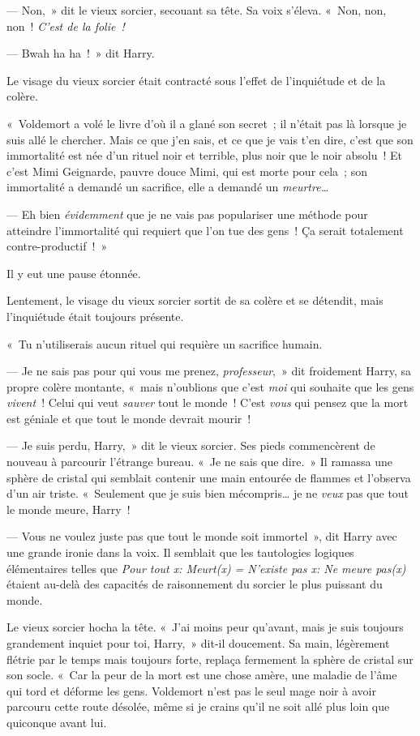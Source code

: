 --- Non,~» dit le vieux sorcier, secouant sa tête. Sa voix s'éleva. «~Non, non, non~! \emph{C'est de la folie~!}

--- Bwah ha ha~!~» dit Harry.

Le visage du vieux sorcier était contracté sous l'effet de l'inquiétude et de la colère.

«~Voldemort a volé le livre d'où il a glané son secret~; il n'était pas là lorsque je suis allé le chercher. Mais ce que j'en sais, et ce que je vais t'en dire, c'est que son immortalité est née d'un rituel noir et terrible, plus noir que le noir absolu~! Et c'est Mimi Geignarde, pauvre douce Mimi, qui est morte pour cela~; son immortalité a demandé un sacrifice, elle a demandé un \emph{meurtre…}

--- Eh bien \emph{évidemment} que je ne vais pas populariser une méthode pour atteindre l'immortalité qui requiert que l'on tue des gens~! Ça serait totalement contre-productif~!~»

Il y eut une pause étonnée.

Lentement, le visage du vieux sorcier sortit de sa colère et se détendit, mais l'inquiétude était toujours présente.

«~Tu n'utiliserais aucun rituel qui requière un sacrifice humain.

--- Je ne sais pas pour qui vous me prenez, \emph{professeur},~» dit froidement Harry, sa propre colère montante, «~mais n'oublions que c'est \emph{moi} qui souhaite que les gens \emph{vivent}~! Celui qui veut \emph{sauver} tout le monde~! C'est \emph{vous} qui pensez que la mort est géniale et que tout le monde devrait mourir~!

--- Je suis perdu, Harry,~» dit le vieux sorcier. Ses pieds commencèrent de nouveau à parcourir l'étrange bureau. «~Je ne sais que dire.~» Il ramassa une sphère de cristal qui semblait contenir une main entourée de flammes et l'observa d'un air triste. «~Seulement que je suis bien mécompris… je ne \emph{veux} pas que tout le monde meure, Harry~!

--- Vous ne voulez juste pas que tout le monde soit immortel~», dit Harry avec une grande ironie dans la voix. Il semblait que les tautologies logiques élémentaires telles que \emph{Pour tout x: Meurt(x) = N'existe pas x: Ne meure pas(x)} étaient au-delà des capacités de raisonnement du sorcier le plus puissant du monde.

Le vieux sorcier hocha la tête. «~J'ai moins peur qu'avant, mais je suis toujours grandement inquiet pour toi, Harry,~» dit-il doucement. Sa main, légèrement flétrie par le temps mais toujours forte, replaça fermement la sphère de cristal sur son socle. «~Car la peur de la mort est une chose amère, une maladie de l'âme qui tord et déforme les gens. Voldemort n'est pas le seul mage noir à avoir parcouru cette route désolée, même si je crains qu'il ne soit allé plus loin que quiconque avant lui.


